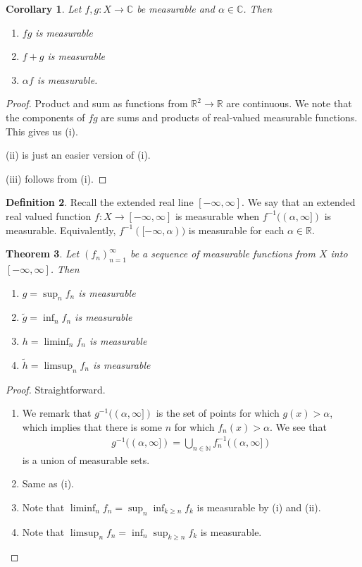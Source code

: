 \documentclass[11pt]{amsart}
\newtheorem{theorem}{Theorem}[section]
\newtheorem{corollary}[theorem]{Corollary}
\theoremstyle{definition}
\newtheorem{definition}[theorem]{Definition}
\numberwithin{equation}{section}
\begin{document}
\begin{corollary}
    Let $f,g:X\to\mathbb C$ be measurable and $\alpha\in\mathbb C$. Then
    \begin{enumerate}
        \item [(i)] $fg$ is measurable
        \item [(ii)] $f+g$ is measurable
        \item [(iii)] $\alpha f$ is measurable.
    \end{enumerate}
\end{corollary}
\begin{proof}
    Product and sum as functions from $\mathbb R^2\to\mathbb R$ are continuous. We note that the components of $fg$ are sums and products of real-valued measurable functions. This gives us (i).

    (ii) is just an easier version of (i).

    (iii) follows from (i).
\end{proof}
\begin{definition}
    Recall the extended real line $[-\infty,\infty]$. We say that an extended real valued function $f:X\to[-\infty,\infty]$ is measurable when $f^{-1}((\alpha,\infty])$ is measurable. Equivalently, $f^{-1}([-\infty,\alpha))$ is measurable for each $\alpha\in\mathbb R$.
\end{definition}
\begin{theorem}\label{limitmeasurable}
    Let $(f_n)_{n=1}^\infty$ be a sequence of measurable functions from $X$ into $[-\infty,\infty]$. Then
    \begin{enumerate}
        \item [(i)] $g=\sup_nf_n$ is measurable
        \item [(ii)] $\tilde{g}=\inf_nf_n$ is measurable
        \item [(iii)] $h=\liminf_nf_n$ is measurable
        \item [(iv)] $\tilde{h}=\limsup_nf_n$ is measurable
    \end{enumerate}
\end{theorem}
\begin{proof}
Straightforward.
\begin{enumerate}
    \item [(i)] We remark that $g^{-1}((\alpha,\infty])$ is the set of points for which $g(x)>\alpha$, which implies that there is some $n$ for which $f_n(x)>\alpha$. We see that
    \begin{align*}
        g^{-1}((\alpha,\infty])=\bigcup_{n\in\mathbb N}f_n^{-1}((\alpha,\infty])
    \end{align*}
    is a union of measurable sets.
    \item [(ii)] Same as (i).
    \item [(iii)] Note that $\liminf_nf_n=\sup_n\inf_{k\ge n}f_k$ is measurable by (i) and (ii).
    \item [(iv)] Note that $\limsup_nf_n=\inf_n\sup_{k\ge n}f_k$ is measurable.
\end{enumerate}
\end{proof}
\end{document}
